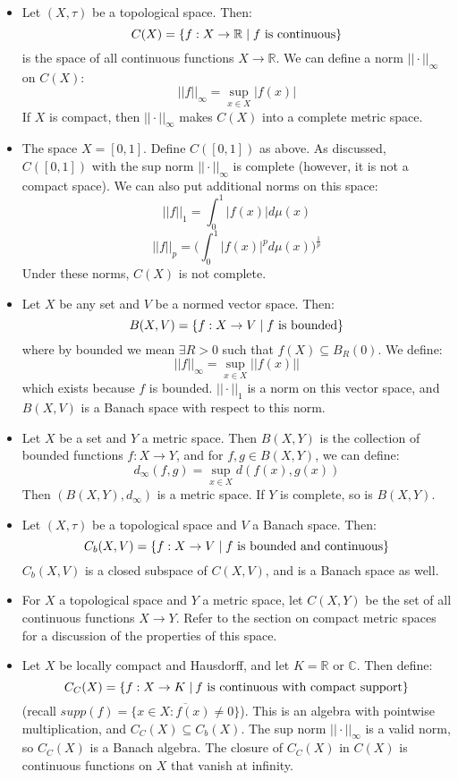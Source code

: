 	\begin{itemize}
	
		\item Let $(X, \tau)$ be a topological space. Then:
		$$
			C(X) = \{f : X\rightarrow\mathbb R \;|\; f\textnormal{ is continuous}\}
		$$
		is the space of all continuous functions $X\rightarrow\mathbb R$. We can define a norm $||\cdot||_\infty$ on $C(X)$:
		$$
			||f||_\infty = \sup_{x\in X} |f(x)|
		$$
		If $X$ is compact, then $||\cdot||_\infty$ makes $C(X)$ into a complete metric space. 
				
		\item The space $X = [0, 1]$. Define $C([0, 1])$ as above. As discussed, $C([0, 1])$ with the sup norm $||\cdot||_\infty$ 
		is complete (however, it is not a compact space). We can also put additional norms on this space:
		$$
			||f||_1 = \int_0^1 |f(x)|d\mu(x)
		$$
		$$
			||f||_p = \big(\int_0^1 |f(x)|^pd\mu(x)\big)^{\frac{1}{p}}
		$$
		Under these norms, $C(X)$ is not complete.
		
		\item Let $X$ be any set and $V$ be a normed vector space. Then:
		$$
			B(X, V) = \{f : X\rightarrow V\;|\; f\textnormal{ is bounded}\}
		$$
		where by bounded we mean $\exists R > 0$ such that $f(X)\subseteq B_R(0)$. We define:
		$$
			||f||_\infty = \sup_{x\in X} ||f(x)||
		$$
		which exists because $f$ is bounded. $||\cdot||_1$ is a norm on this vector space, and $B(X, V)$ is a Banach 
		space with respect to this norm. 
		
		\item Let $X$ be a set and $Y$ a metric space. Then $B(X, Y)$ is the collection of bounded functions $f : X
		\rightarrow Y$, and for $f, g\in B(X, Y)$, we can define:
		$$
			d_\infty(f, g) = \sup_{x\in X} d(f(x), g(x))
		$$
		Then $(B(X, Y), d_\infty)$ is a metric space. If $Y$ is complete, so is $B(X, Y)$. 
		
		\item Let $(X, \tau)$ be a topological space and $V$ a Banach space. Then:
		$$
			C_b(X, V) = \{f : X\rightarrow V\;|\; f \textnormal{ is bounded and continuous}\}
		$$
		$C_b(X, V)$ is a closed subspace of $C(X, V)$, and is a Banach space as well. 
		
		\item For $X$ a topological space and $Y$ a metric space, let $C(X, Y)$ be the set of all continuous functions $X
		\rightarrow Y$. Refer to the section on compact metric spaces for a discussion of the properties of this space.
		
		\item Let $X$ be locally compact and Hausdorff, and let $K = \mathbb R$ or $\mathbb C$. Then define:
		$$
			C_C(X) = \{f : X\rightarrow K\;|\:f \textnormal{ is continuous with compact support}\}
		$$
		(recall $supp(f) = \overline{\{x\in X : f(x)\neq 0\}}$). This is an algebra with pointwise multiplication, and $C_C(X)
		\subseteq C_b(X)$. The sup norm $||\cdot||_\infty$ is a valid norm, so $C_C(X)$ is a Banach algebra. The closure 
		of $C_C(X)$ in $C(X)$ is continuous functions on $X$ that vanish at infinity. 
		
	\end{itemize}

